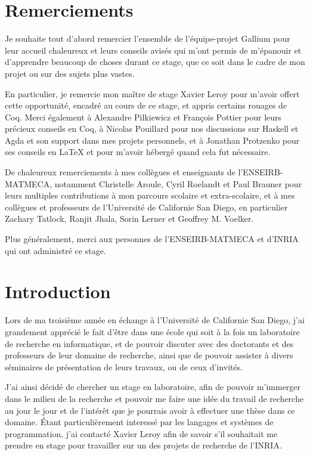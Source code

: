 \documentclass{article}
\begin{document}
\newpage
{}
{}
\section*{Remerciements}

Je souhaite tout d'abord remercier l'ensemble de l'équipe-projet Gallium pour
leur accueil chaleureux et leurs conseils avisés qui m'ont permis de m'épanouir
et d'apprendre beaucoup de choses durant ce stage, que ce soit dans le cadre de
mon projet ou sur des sujets plus vastes.

En particulier, je remercie mon maître de stage Xavier Leroy pour m'avoir
offert cette opportunité, encadré au cours de ce stage, et appris certains
rouages de Coq. Merci également à Alexandre Pilkiewicz et François Pottier pour
leurs précieux conseils en Coq, à Nicolas Pouillard pour nos discussions sur
Haskell et Agda et son support dans mes projets personnels, et à Jonathan
Protzenko pour ses conseils en LaTeX et pour m'avoir hébergé quand cela fut
nécessaire.

De chaleureux remerciements à mes collègues et enseignants de
l'ENSEIRB-MATMECA, notamment Christelle Aroule, Cyril Roelandt et Paul Brauner
pour leurs multiples contributions à mon parcours scolaire et extra-scolaire,
et à mes collègues et professeurs de l'Université de Californie San Diego, en
particulier Zachary Tatlock, Ranjit Jhala, Sorin Lerner et Geoffrey M. Voelker.

Plus généralement, merci aux personnes de l'ENSEIRB-MATMECA et d'INRIA qui ont
administré ce stage.

\newpage
\section{Introduction}

Lors de ma troisième année en échange à l'Université de Californie San Diego,
j'ai grandement apprécié le fait d'être dans une école qui soit à la fois un
laboratoire de recherche en informatique, et de pouvoir discuter avec des
doctorants et des professeurs de leur domaine de recherche, ainsi que de
pouvoir assister à divers séminaires de présentation de leurs travaux, ou de
ceux d'invités.

J'ai ainsi décidé de chercher un stage en laboratoire, afin de pouvoir
m'immerger dans le milieu de la recherche et pouvoir me faire une idée du
travail de recherche au jour le jour et de l'intérêt que je pourrais avoir à
effectuer une thèse dans ce domaine. Étant particulièrement interessé par les
langages et systèmes de programmation, j'ai contacté Xavier Leroy afin de
savoir s'il souhaitait me prendre en stage pour travailler sur un des projets
de recherche de l'INRIA.
\end{document}
